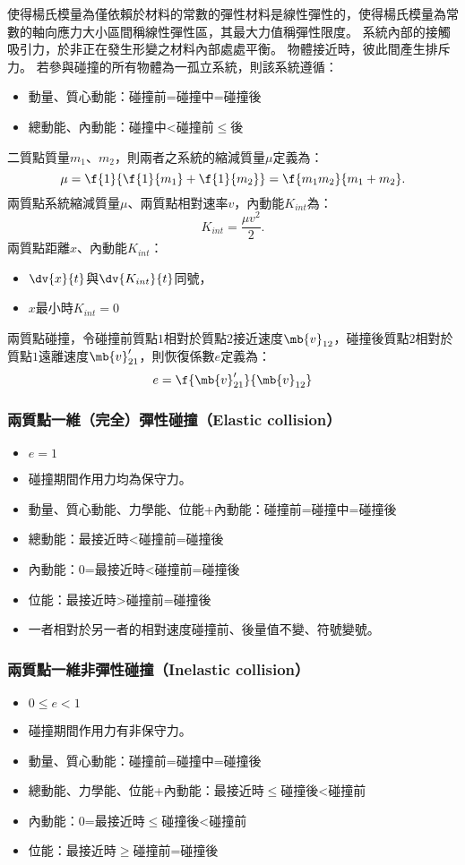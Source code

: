 \documentclass[a4paper,12pt]{article}
\begin{document}
使得楊氏模量為僅依賴於材料的常數的彈性材料是線性彈性的，使得楊氏模量為常數的軸向應力大小區間稱線性彈性區，其最大力值稱彈性限度。
系統內部的接觸吸引力，於非正在發生形變之材料內部處處平衡。
物體接近時，彼此間產生排斥力。
若參與碰撞的所有物體為一孤立系統，則該系統遵循：
\begin{itemize}
\item 動量、質心動能：碰撞前=碰撞中=碰撞後
\item 總動能、內動能：碰撞中<碰撞前$\leq$後
\end{itemize}
二質點質量$m_1$、$m_2$，則兩者之系統的縮減質量$\mu$定義為：
\[\mu=\f{1}{\f{1}{m_1}+\f{1}{m_2}} = \f{m_1m_2}{m_1+m_2}.\]
兩質點系統縮減質量$\mu$、兩質點相對速率$v$，內動能$K_{int}$為：
\[K_{int}= \frac{\mu v^2}{2}.\]
兩質點距離$x$、內動能$K_{int}$：
\begin{itemize}
\item $\dv{x}{t}$與$\dv{K_{int}}{t}$同號，
\item $x$最小時$K_{int}=0$
\end{itemize}
兩質點碰撞，令碰撞前質點$1$相對於質點$2$接近速度$\mb{v}_{12}$，碰撞後質點$2$相對於質點$1$遠離速度$\mb{v}'_{21}$，則恢復係數$e$定義為：
\[e = \f{\mb{v}'_{21}}{\mb{v}_{12}} \]
\subsubsection{兩質點一維（完全）彈性碰撞（Elastic collision）}
\begin{itemize}
\item $e=1$
\item 碰撞期間作用力均為保守力。
\item 動量、質心動能、力學能、位能+內動能：碰撞前=碰撞中=碰撞後
\item 總動能：最接近時<碰撞前=碰撞後
\item 內動能：0=最接近時<碰撞前=碰撞後
\item 位能：最接近時>碰撞前=碰撞後
\item 一者相對於另一者的相對速度碰撞前、後量值不變、符號變號。
\end{itemize}
\subsubsection{兩質點一維非彈性碰撞（Inelastic collision）}
\begin{itemize}
\item $0\leq e<1$
\item 碰撞期間作用力有非保守力。
\item 動量、質心動能：碰撞前=碰撞中=碰撞後
\item 總動能、力學能、位能+內動能：最接近時$\leq$碰撞後<碰撞前
\item 內動能：0=最接近時$\leq$碰撞後<碰撞前
\item 位能：最接近時$\geq$碰撞前=碰撞後
\end{itemize}
\end{document}
